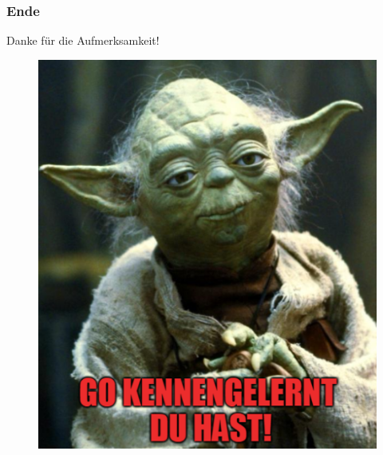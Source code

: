 \documentclass{beamer}
\begin{document}
\begin{frame}
\frametitle{Ende}

\centering
Danke f\"ur die Aufmerksamkeit!

\begin{figure}
\includegraphics[scale=0.4]{joda.png}
\end{figure}

\end{frame}
\end{document}
